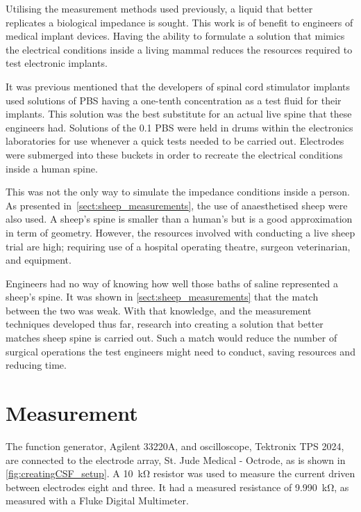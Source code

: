 
Utilising the measurement methods used previously, a liquid that better replicates a biological impedance is sought.
This work is of benefit to engineers of medical implant devices.
Having the ability to formulate a solution that mimics the electrical conditions inside a living mammal reduces the resources required to test electronic implants.

It was previous mentioned that the developers of spinal cord stimulator implants used solutions of PBS having a one-tenth concentration as a test fluid for their implants.
This solution was the best substitute for an actual live spine that these engineers had.
Solutions of the \SI{0.1}{\times} PBS were held in drums within the electronics laboratories for use whenever a quick tests needed to be carried out.
Electrodes were submerged into these buckets in order to recreate the electrical conditions inside a human spine.

This was not the only way to simulate the impedance conditions inside a person.
As presented in~\cref{sect:sheep_measurements}, the use of anaesthetised sheep were also used.
A sheep's spine is smaller than a human's but is a good approximation in term of geometry.
However, the resources involved with conducting a live sheep trial are high; requiring use of a hospital operating theatre, surgeon veterinarian, and equipment.

Engineers had no way of knowing how well those baths of saline represented a sheep's spine.
It was shown in \cref{sect:sheep_measurements} that the match between the two was weak.
With that knowledge, and the measurement techniques developed thus far, research into creating a solution that better matches sheep spine is carried out.
Such a match would reduce the number of surgical operations the test engineers might need to conduct, saving resources and reducing time.


\section{Measurement}


  The function generator, Agilent 33220A, and oscilloscope, Tektronix TPS 2024, are connected to the electrode array, St. Jude Medical - Octrode, as is shown in \cref{fig:creatingCSF_setup}.
  A \SI{10}{\kilo\ohm} resistor was used to measure the current driven between electrodes eight and three.
  It had a measured resistance of \SI{9.990}{\kilo\ohm}, as measured with a Fluke Digital Multimeter.
  
